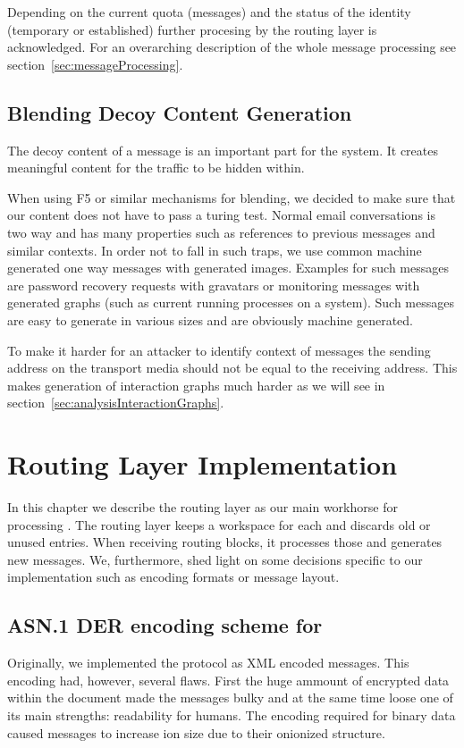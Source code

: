 Depending on the current quota (messages) and the status of the identity (temporary or established) further procesing by the routing layer is acknowledged. For an overarching description of the whole message processing see section~\ref{sec:messageProcessing}.


\section{Blending Decoy Content Generation}
The decoy content of a message is an important part for the \MessageVortex system. It creates meaningful content for the traffic to be hidden within.

When using F5 or similar mechanisms for blending, we decided to make sure that our content does not have to pass a turing test. Normal email conversations is two way and has many properties such as references to previous messages and similar contexts. In order not to fall in such traps, we use common machine  generated one way messages with generated images. Examples for such messages are password recovery requests with gravatars or monitoring messages with generated graphs (such as current running processes on a system). Such messages are easy to generate in various sizes and are obviously machine generated.

To make it harder for an attacker to identify context of messages the sending address on the transport media should not be equal to the receiving address. This makes generation of interaction graphs much harder as we will see in section~\ref{sec:analysisInteractionGraphs}.

\chapter{Routing Layer Implementation}
In this chapter we describe the routing layer as our main workhorse for processing \VortexMessages. The routing layer keeps a workspace for each  and discards old or unused entries. When receiving routing blocks, it processes those and generates new messages. We, furthermore, shed light on some decisions specific to our implementation such as encoding formats or message layout.

\section{ASN.1 DER encoding scheme for \VortexMessages}
Originally, we implemented the protocol as XML encoded messages. This encoding had, however, several flaws. First the huge ammount of encrypted data within the document made the messages bulky and at the same time loose one of its main strengths: readability for humans. The encoding required for binary data caused messages to increase ion size due to their onionized structure. 

